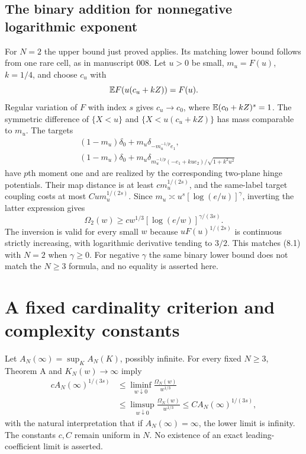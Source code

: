 \subsection*{The binary addition for nonnegative logarithmic exponent}
For $N=2$ the upper bound just proved applies. Its matching lower bound follows from one rare cell, as in manuscript 008. Let $u>0$ be small, $m_u=F(u)$, $k=1/4$, and choose $c_u$ with
\[
 \mathbb E F(u(c_u+kZ))=F(u).
\]
Regular variation of $F$ with index $s$ gives $c_u\to c_0$, where $\mathbb E(c_0+kZ)^s=1$. The symmetric difference of $\{X<u\}$ and $\{X<u(c_u+kZ)\}$ has mass comparable to $m_u$. The targets
\begin{align*}
 &(1-m_u)\delta_0+m_u\delta_{-m_u^{-1/p}e_1},\\
 &(1-m_u)\delta_0+m_u\delta_{m_u^{-1/p}(-e_1+kue_2)/\sqrt{1+k^2u^2}}
\end{align*}
have $p$th moment one and are realized by the corresponding two-plane hinge potentials. Their map distance is at least $cm_u^{1/(2s)}$, and the same-label target coupling costs at most $Cum_u^{1/(2s)}$. Since $m_u\asymp u^s[\log(e/u)]^\gamma$, inverting the latter expression gives
\[
 \Omega_2(w)\ge cw^{1/3}[\log(e/w)]^{\gamma/(3s)}.
\]
The inversion is valid for every small $w$ because $uF(u)^{1/(2s)}$ is continuous strictly increasing, with logarithmic derivative tending to $3/2$. This matches (8.1) with $N=2$ when $\gamma\ge0$. For negative $\gamma$ the same binary lower bound does not match the $N\ge3$ formula, and no equality is asserted here.

\section{A fixed cardinality criterion and complexity constants}
Let $A_N(\infty)=\sup_K A_N(K)$, possibly infinite. For every fixed $N\ge3$, Theorem A and $K_N(w)\to\infty$ imply
\begin{equation}
 \begin{aligned}
 cA_N(\infty)^{1/(3s)}
 &\le\liminf_{w\downarrow0}\frac{\Omega_N(w)}{w^{1/3}}\\
 &\le\limsup_{w\downarrow0}\frac{\Omega_N(w)}{w^{1/3}}
 \le CA_N(\infty)^{1/(3s)},
 \end{aligned}\tag{9.1}
\end{equation}
with the natural interpretation that if $A_N(\infty)=\infty$, the lower limit is infinity. The constants $c,C$ remain uniform in $N$. No existence of an exact leading-coefficient limit is asserted.

